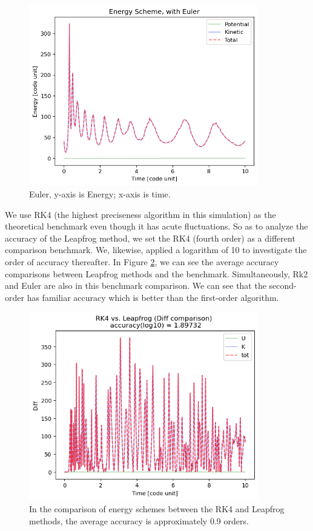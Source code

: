 \documentclass[12pt]{article}
\begin{document}
    \begin{figure}[H]
        \centering 
        \includegraphics[width = 10cm]{./Euler/Energy.png}
        \caption{Euler, y-axis is Energy; x-axis is time.}
        \label{E4}
    \end{figure}

    We use RK4 (the highest preciseness algorithm in this simulation) as the theoretical benchmark even though it has acute fluctuations. So as to analyze the accuracy of the Leapfrog method, we set the RK4 (fourth order) as a different comparison benchmark. We, likewise, applied a logarithm of 10 to investigate the order of accuracy thereafter. In Figure \ref{RK4_LF}, we can see the average accuracy comparisons between Leapfrog methods and the benchmark. Simultaneously, Rk2 and Euler are also in this benchmark comparison. We can see that the second-order has familiar accuracy which is better than the first-order algorithm.

    \begin{figure}[H]
        \centering 
        \includegraphics[width = 10cm]{./Compare/LF.png}
        \caption{In the comparison of energy schemes between the RK4 and Leapfrog methods, the average accuracy is approximately 0.9 orders.}
        \label{RK4_LF}
    \end{figure}
\end{document}
